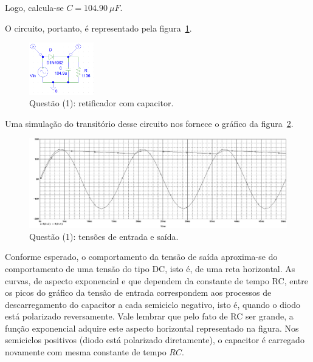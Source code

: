 \documentclass[12pt, a4paper]{article}
\begin{document}
\begin{enumerate}
            Logo, calcula-se \(C= 104.90 ~\mu F\).
            
            O circuito, portanto, é representado pela figura~\ref{circ21}.
            
            \begin{figure}[h!] 
                \centering
                \includegraphics[width=0.250\textwidth]{circ21}
                \caption{Questão (1): retificador com capacitor.}        
                \label{circ21}
            \end{figure}

            Uma simulação do transitório desse circuito nos fornece o gráfico da figura~\ref{graf21}.
            
            \begin{figure}[h!] 
                \centering
                \includegraphics[width=1\textwidth]{graf21}
                \caption{Questão (1): tensões de entrada e saída.}        
                \label{graf21}
            \end{figure}
            
            Conforme esperado, o comportamento da tensão de saída aproxima-se do comportamento de uma tensão do tipo DC, isto é, de uma reta horizontal. As curvas, de aspecto exponencial e que dependem da constante de tempo RC, entre os picos do gráfico da tensão de entrada correspondem aos processos de descarregamento do capacitor a cada semiciclo negativo, isto é, quando o diodo está polarizado reversamente. Vale lembrar que pelo fato de RC ser grande, a função exponencial adquire este aspecto horizontal representado na figura. Nos semiciclos positivos (diodo está polarizado diretamente), o capacitor é carregado novamente com mesma constante de tempo \(RC\).
            

\end{enumerate}
\end{document}
